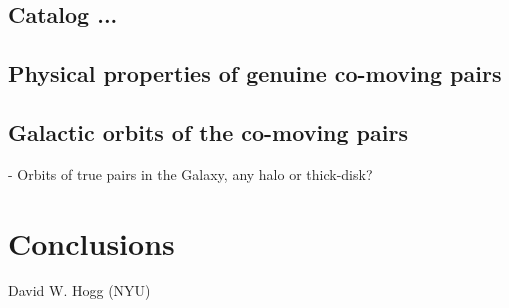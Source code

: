 \documentclass[modern, letterpaper]{aastex61}
\begin{document}
\subsection{Catalog ...}\label{sec:}

\subsection{Physical properties of genuine co-moving pairs}\label{sec:}

\subsection{Galactic orbits of the co-moving pairs}\label{sec:}

- Orbits of true pairs in the Galaxy, any halo or thick-disk?

\section{Conclusions }



\acknowledgements
David W. Hogg (NYU)



\end{document}
